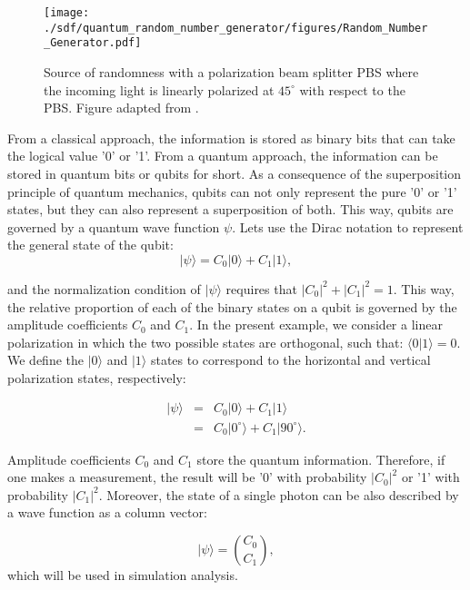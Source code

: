 \begin{refsection}
\begin{figure}[H]
    \centering
        \texttt{[image: ./sdf/quantum\_random\_number\_generator/figures/Random\_Number\_Generator.pdf]}
    \caption{Source of randomness with a polarization beam splitter PBS where the incoming light is linearly polarized at $45^{\circ}$ with respect to the PBS. Figure adapted from \cite{Jennewein00}.}\label{qrng}
\end{figure}

From a classical approach, the information is stored as binary bits that can take the logical value '0' or '1'. From a quantum approach, the information can be stored in quantum bits or qubits for short. As a consequence of the superposition principle of quantum mechanics, qubits can not only represent the pure '0' or '1' states, but they can also represent a superposition of both. This way, qubits are governed by a quantum wave function $\psi$. Lets use the Dirac notation to represent the general state of the qubit:
\begin{equation}\label{eq:qubit}
  |\psi\rangle = C_0 |0\rangle + C_1 |1\rangle,
\end{equation}

and the normalization condition of $|\psi\rangle$ requires that $|C_0|^2+|C_1|^2=1$. This way, the relative proportion of each of the binary states on a qubit is governed by the amplitude coefficients $C_0$ and $C_1$. In the present example, we consider a linear polarization in which the two possible states are orthogonal, such that: $\langle 0|1 \rangle=0$. We define the $|0\rangle$ and $|1\rangle$ states to correspond to the horizontal and vertical polarization states, respectively:

\begin{eqnarray}
  |\psi\rangle &=& C_0 |0\rangle+C_1 |1\rangle \\
             &=& C_0 |0^{\circ}\rangle + C_1 |90^{\circ}\rangle .
\end{eqnarray}

Amplitude coefficients $C_0$ and $C_1$ store the quantum information. Therefore, if one makes a measurement, the result will be '0' with probability $|C_0|^2$ or '1' with probability $|C_1|^2$.
Moreover, the state of a single photon can be also described by a wave function as a column vector:

\begin{equation}\label{eq:wavefvector}
  |\psi\rangle = \binom{C_0}{C_1},
\end{equation}
which will be used in simulation analysis.


\end{refsection}
